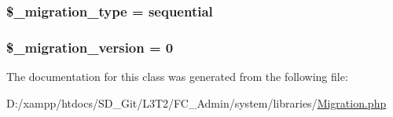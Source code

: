 \subsubsection[{\$\+\_\+migration\+\_\+type}]{\setlength{\rightskip}{0pt plus 5cm}\$\+\_\+migration\+\_\+type = \textquotesingle{}sequential\textquotesingle{}\hspace{0.3cm}{\ttfamily [protected]}}\label{class_c_i___migration_a74ff9f79bd4a13fec8a3f08bc57ead97}
\hypertarget{class_c_i___migration_a6bffbb1001557bd7ffb22183b51f589d}{}
\subsubsection[{\$\+\_\+migration\+\_\+version}]{\setlength{\rightskip}{0pt plus 5cm}\$\+\_\+migration\+\_\+version = 0\hspace{0.3cm}{\ttfamily [protected]}}\label{class_c_i___migration_a6bffbb1001557bd7ffb22183b51f589d}


The documentation for this class was generated from the following file\+:\begin{DoxyCompactItemize}
\item 
D\+:/xampp/htdocs/\+S\+D\+\_\+\+Git/\+L3\+T2/\+F\+C\+\_\+\+Admin/system/libraries/\hyperlink{system_2libraries_2migration_8php}{Migration.\+php}\end{DoxyCompactItemize}
